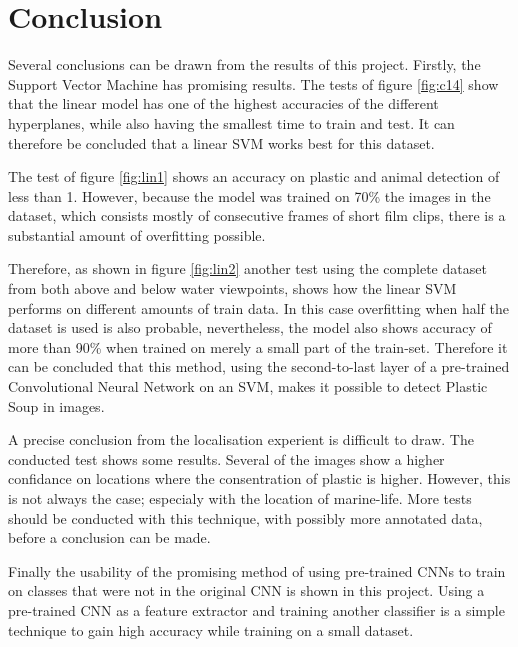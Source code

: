 \section{Conclusion}
\label{sec:Conclusion}
Several conclusions can be drawn from the results of this project.
Firstly, the Support Vector Machine has promising results.
The tests of figure \ref{fig:c14} show that the linear model has one of the highest accuracies of the different hyperplanes, while also having the smallest time to train and test.
It can therefore be concluded that a linear SVM works best for this dataset.

The test of figure \ref{fig:lin1} shows an accuracy on plastic and animal detection of less than 1\permil.
However, because the model was trained on 70\% the images in the dataset, which consists mostly of consecutive frames of short film clips, there is a substantial amount of overfitting possible.

Therefore, as shown in figure \ref{fig:lin2} another test using the complete dataset from both above and below water viewpoints, shows how the linear SVM performs on different amounts of train data.
In this case overfitting when half the dataset is used is also probable, nevertheless, the model also shows accuracy of more than 90\% when trained on merely a small part of the train-set.
Therefore it can be concluded that this method, using the second-to-last layer of a pre-trained Convolutional Neural Network on an SVM, makes it possible to detect Plastic Soup in images.

A precise conclusion from the localisation experient is difficult to draw.
The conducted test shows some results.
Several of the images show a higher confidance on locations where the consentration of plastic is higher.
However, this is not always the case; especialy with the location of marine-life.
More tests should be conducted with this technique, with possibly more annotated data, before a conclusion can be made.

Finally the usability of the promising method of using pre-trained CNNs to train on classes that were not in the original CNN is shown in this project.
Using a pre-trained CNN as a feature extractor and training another classifier is a simple technique to gain high accuracy while training on a small dataset.


